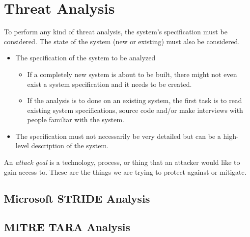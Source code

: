 \section{Threat Analysis}\label{sec:Threat_Analysis}
To perform any kind of threat analysis, the system's specification must be considered.
The state of the system (new or existing) must also be considered.
\begin{itemize}[noitemsep]
\item The specification of the system to be analyzed
  \begin{itemize}[noitemsep]
  \item If a completely new system is about to be built, there might not even exist a system specification and it needs to be created.
  \item If the analysis is to done on an existing system, the first task is to read existing system specifications, source code and/or make interviews with people familiar with the system.
  \end{itemize}

\item The specification must not necessarily be very detailed but can be a high-level description of the system.
\end{itemize}

\begin{definition}\label{def:Attack_Goal}
  An \emph{attack goal} is a technology, process, or thing that an attacker would like to gain access to.
  These are the things we are trying to protect against or mitigate.
\end{definition}



\subsection{Microsoft STRIDE Analysis}\label{subsec:STRIDE_Analysis}

\subsection{MITRE TARA Analysis}\label{subsec:TARA_Analysis}


